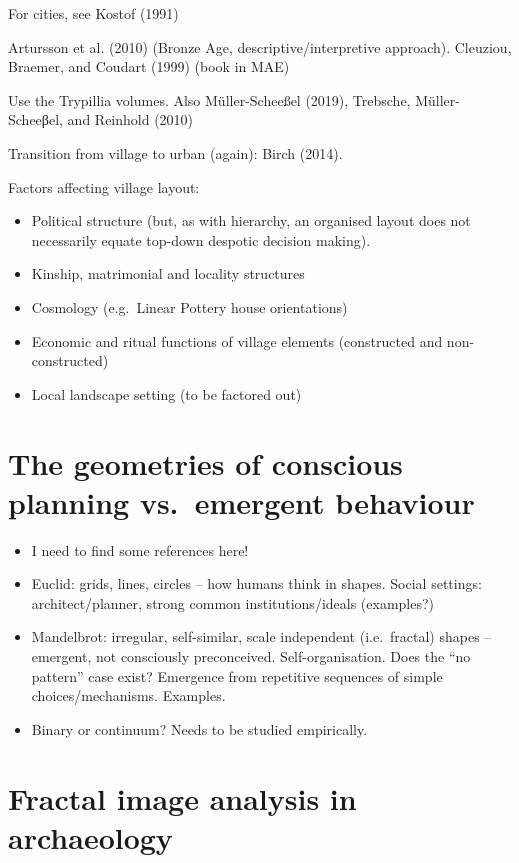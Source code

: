 \documentclass[
  12pt,
]{book}
\begin{document}
For cities, see Kostof (1991)

Artursson et al. (2010) (Bronze Age, descriptive/interpretive approach). Cleuziou, Braemer, and Coudart (1999) (book in MAE)

Use the Trypillia volumes. Also Müller-Scheeßel (2019), Trebsche, Müller-Scheeβel, and Reinhold (2010)

Transition from village to urban (again): Birch (2014).

Factors affecting village layout:

\begin{itemize}
\item
  Political structure (but, as with hierarchy, an organised layout does not necessarily equate top-down despotic decision making).
\item
  Kinship, matrimonial and locality structures
\item
  Cosmology (e.g.~Linear Pottery house orientations)
\item
  Economic and ritual functions of village elements (constructed and non-constructed)
\item
  Local landscape setting (to be factored out)
\end{itemize}

\hypertarget{the-geometries-of-conscious-planning-vs.-emergent-behaviour}{%
\section{The geometries of conscious planning vs.~emergent behaviour}\label{the-geometries-of-conscious-planning-vs.-emergent-behaviour}}

\begin{itemize}
\item
  I need to find some references here!
\item
  Euclid: grids, lines, circles -- how humans think in shapes. Social settings: architect/planner, strong common institutions/ideals (examples?)
\item
  Mandelbrot: irregular, self-similar, scale independent (i.e.~fractal) shapes -- emergent, not consciously preconceived. Self-organisation. Does the ``no pattern'' case exist? Emergence from repetitive sequences of simple choices/mechanisms. Examples.
\item
  Binary or continuum? Needs to be studied empirically.
\end{itemize}

\hypertarget{image-archaeo}{%
\section{Fractal image analysis in archaeology}\label{image-archaeo}}
\end{document}
